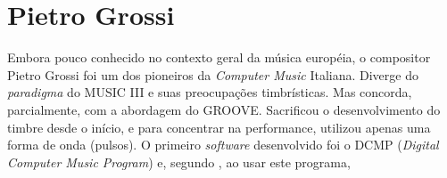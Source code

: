 
\section{Pietro Grossi}\label{sec:grossi}

Embora pouco conhecido no contexto geral da música européia, o compositor Pietro Grossi foi  um dos pioneiros da \emph{Computer Music} Italiana. Diverge do \emph{paradigma} do MUSIC III e suas preocupações timbrísticas. Mas concorda, parcialmente, com a abordagem do GROOVE. Sacrificou o desenvolvimento do timbre desde o início, e para concentrar na performance, utilizou apenas uma forma de onda (pulsos). O primeiro \emph{software} desenvolvido foi o DCMP (\emph{Digital Computer Music Program}) e, segundo \cite{mori_pietro_2015}, ao usar este programa,

